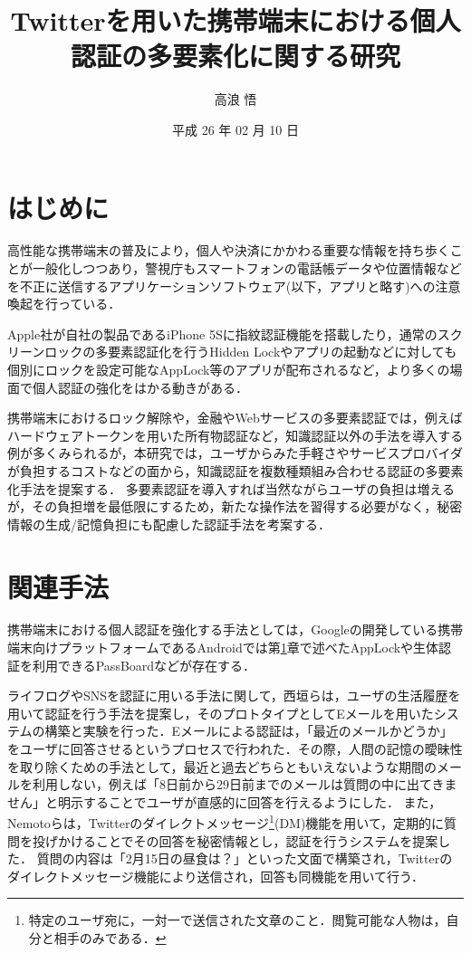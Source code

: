 \documentclass[twocolumn, a4paper, 9pt]{UECIEresume}
\title{Twitterを用いた携帯端末における個人認証の多要素化に関する研究}
\date{平成 26 年 02 月 10 日}
\affiliation{総合情報学科 セキュリティ情報学 コース}
\author{高浪 悟}
\begin{document}
\maketitle

\section{はじめに}\label{introduction}
高性能な携帯端末の普及\cite{idcsmartphone}により，個人や決済にかかわる重要な情報を持ち歩くことが一般化しつつあり，警視庁もスマートフォンの電話帳データや位置情報などを不正に送信するアプリケーションソフトウェア(以下，アプリと略す)への注意喚起を行っている\cite{keishichoSmartphone}．

Apple社が自社の製品であるiPhone 5Sに指紋認証機能を搭載したり，通常のスクリーンロックの多要素認証化を行うHidden Lock\cite{hiddenLock}やアプリの起動などに対しても個別にロックを設定可能なAppLock\cite{applock}等のアプリが配布されるなど，より多くの場面で個人認証の強化をはかる動きがある．

携帯端末におけるロック解除や，金融やWebサービスの多要素認証では，例えばハードウェアトークンを用いた所有物認証など，知識認証以外の手法を導入する例が多くみられるが，本研究では，ユーザからみた手軽さやサービスプロバイダが負担するコストなどの面から，知識認証を複数種類組み合わせる認証の多要素化手法を提案する．
多要素認証を導入すれば当然ながらユーザの負担は増えるが，その負担増を最低限にするため，新たな操作法を習得する必要がなく，秘密情報の生成/記憶負担にも配慮した認証手法を考案する．

\section{関連手法}
携帯端末における個人認証を強化する手法としては，Googleの開発している携帯端末向けプラットフォームであるAndroidでは第\ref{introduction}章で述べたAppLock\cite{applock}や生体認証を利用できるPassBoard\cite{passboard}などが存在する．

ライフログやSNSを認証に用いる手法に関して，西垣ら\cite{西垣正勝:2006-03-15}は，ユーザの生活履歴を用いて認証を行う手法を提案し，そのプロトタイプとしてEメールを用いたシステムの構築と実験を行った．Eメールによる認証は，「最近のメールかどうか」をユーザに回答させるというプロセスで行われた．その際，人間の記憶の曖昧性を取り除くための手法として，最近と過去どちらともいえないような期間のメールを利用しない，例えば「8日前から29日前までのメールは質問の中に出てきません」と明示することでユーザが直感的に回答を行えるようにした．
また，Nemotoら\cite{nemoto:2006-03-15}は，Twitterのダイレクトメッセージ\footnote{特定のユーザ宛に，一対一で送信された文章のこと．閲覧可能な人物は，自分と相手のみである．}(DM)機能を用いて，定期的に質問を投げかけることでその回答を秘密情報とし，認証を行うシステムを提案した．
質問の内容は「2月15日の昼食は？」といった文面で構築され，Twitterのダイレクトメッセージ機能により送信され，回答も同機能を用いて行う．
\end{document}
